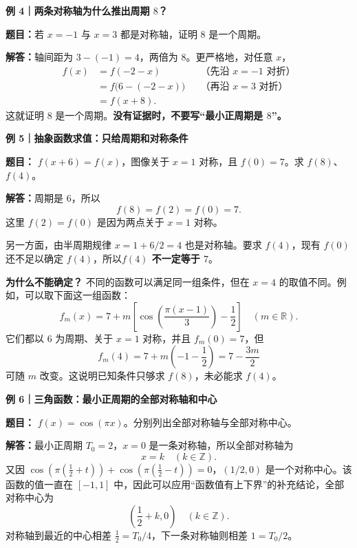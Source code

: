 \clearpage
\begin{examplebox}
\textbf{\textcolor{CExample}{例 4｜两条对称轴为什么推出周期 $8$？}}



\textbf{题目：}若 $x=-1$ 与 $x=3$ 都是对称轴，证明 $8$ 是一个周期。

\textbf{解答：}轴间距为 $3-(-1)=4$，两倍为 $8$。更严格地，对任意 $x$，
\[
\begin{aligned}
f(x)&=f(-2-x) &&\text{（先沿 $x=-1$ 对折）}\\
&=f\bigl(6-(-2-x)\bigr)&&\text{（再沿 $x=3$ 对折）}\\
&=f(x+8).
\end{aligned}
\]
这就证明 $8$ 是一个周期。\textbf{没有证据时，不要写“最小正周期是 $8$”。}

\medskip

\end{examplebox}
\clearpage
\begin{examplebox}
\textbf{\textcolor{CExample}{例 5｜抽象函数求值：只给周期和对称条件}}



\textbf{题目：} $f(x+6)=f(x)$，图像关于 $x=1$ 对称，且 $f(0)=7$。求 $f(8)$、$f(4)$。

\textbf{解答：}周期是 $6$，所以
\[
f(8)=f(2)=f(0)=7.
\]
这里 $f(2)=f(0)$ 是因为两点关于 $x=1$ 对称。

另一方面，由半周期规律 $x=1+6/2=4$ 也是对称轴。要求 $f(4)$，现有 $f(0)$ 还不足以确定 $f(4)$，所以\textbf{$f(4)$ 不一定等于 $7$}。

\textbf{为什么不能确定？} 不同的函数可以满足同一组条件，但在 $x=4$ 的取值不同。例如，可以取下面这一组函数：
\[
\boxed{f_m(x)=7+m\left[\cos\left(\frac{\pi(x-1)}{3}\right)-\frac12\right]\quad(m\in\mathbb R).}
\]
它们都以 $6$ 为周期、关于 $x=1$ 对称，并且 $f_m(0)=7$，但
\[
f_m(4)=7+m\left(-1-\frac12\right)=7-\frac{3m}{2}
\]
可随 $m$ 改变。这说明已知条件只够求 $f(8)$，未必能求 $f(4)$。

\medskip

\end{examplebox}
\clearpage
\begin{examplebox}
\textbf{\textcolor{CExample}{例 6｜三角函数：最小正周期的全部对称轴和中心}}



\textbf{题目：} $f(x)=\cos(\pi x)$。分别列出全部对称轴与全部对称中心。

\textbf{解答：}最小正周期 $T_0=2$，$x=0$ 是一条对称轴，所以全部对称轴为
\[
\boxed{x=k\quad(k\in\mathbb Z).}
\]
又因 $\cos(\pi(\tfrac12+t))+\cos(\pi(\tfrac12-t))=0$，$(1/2,0)$ 是一个对称中心。该函数的值一直在 $[-1,1]$ 中，因此可以应用“函数值有上下界”的补充结论，全部对称中心为
\[
\boxed{\left(\frac12+k,0\right)\quad(k\in\mathbb Z).}
\]
对称轴到最近的中心相差 $\frac12=T_0/4$，下一条对称轴则相差 $1=T_0/2$。

\medskip

\end{examplebox}
